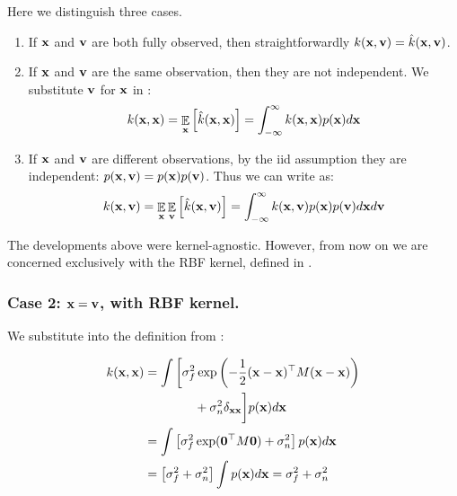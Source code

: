 \documentclass[letterpaper]{article}
\DeclareMathOperator*{\E}{\Ex}
\newcommand{\Ex}{\mathbb{E}}
\newcommand{\tp}{\top}
\newcommand{\vx}{{\bf x}}
\newcommand{\vv}{{\bf v}}
\begin{document}
Here we distinguish three cases.
\begin{enumerate}
\item If $\vx$ and $\vv$ are both fully observed, then straightforwardly $k(\vx,
\vv) = \hat{k}(\vx, \vv)$.

\item If $\vx$ and $\vv$ are the same observation, then they are not
  independent. We substitute $\vv$ for $\vx$ in :
\begin{equation}
  k(\vx, \vx) = \E_\vx \left[\hat{k}(\vx, \vx) \right] = \int_{-\infty}^\infty
k(\vx, \vx) p(\vx) d\vx
  \label{eq:same-inputs}
\end{equation}

\item If $\vx$ and $\vv$ are different observations, by
the \ac{iid} assumption they are independent: $p(\vx, \vv) = p(\vx)p(\vv)$. Thus
we can write  as:
\begin{equation}
  k(\vx, \vv) = \E_\vx \E_\vv \left[ \hat{k}(\vx, \vv) \right] = 
  \int_{-\infty}^\infty k(\vx, \vv) p(\vx) p(\vv) d\vx d\vv
  \label{eq:independent-inputs}
\end{equation}
\end{enumerate}

The developments above were kernel-agnostic. However, from now on we are
concerned exclusively with the \ac{RBF} kernel, defined in
.

\subsubsection{Case 2: $\vx=\vv$, with \ac{RBF} kernel.}
We substitute into  the definition from
:

\begin{equation*}
\begin{aligned}
 k(\vx, \vx) &= \int \bigg[\sigma_f^2 \exp\left( -\frac{1}{2}(\vx - \vx)^\tp M
     (\vx - \vx) \right) \\
   &\hspace{4em} + \sigma_n^2 \delta_{\vx\vx} \bigg] p(\vx) d\vx \\
 &= \int \left[ \sigma_f^2 \exp({\bf 0}^\tp M {\bf 0}) + \sigma_n^2 \right] p(\vx) d\vx \\
&= \left[ \sigma_f^2 + \sigma_n^2 \right] \int p(\vx) d\vx = \sigma_f^2 + \sigma_n^2
\end{aligned}
\end{equation*}
\end{document}
